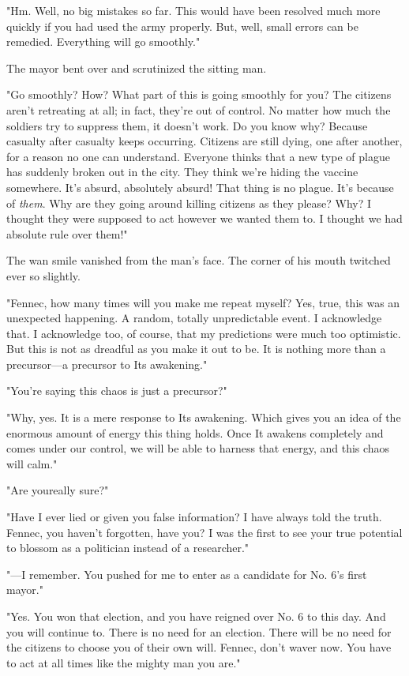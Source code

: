 "Hm. Well, no big mistakes so far. This would have been resolved much
more quickly if you had used the army properly. But, well, small errors
can be remedied. Everything will go smoothly."

The mayor bent over and scrutinized the sitting man.

"Go smoothly? How? What part of this is going smoothly for you? The
citizens aren't retreating at all; in fact, they're out of control. No
matter how much the soldiers try to suppress them, it doesn't work. Do
you know why? Because casualty after casualty keeps occurring. Citizens
are still dying, one after another, for a reason no one can understand.
Everyone thinks that a new type of plague has suddenly broken out in the
city. They think we're hiding the vaccine somewhere. It's absurd,
absolutely absurd! That thing is no plague. It's because of \emph{them}. Why
are they going around killing citizens as they please? Why? I thought
they were supposed to act however we wanted them to. I thought we had
absolute rule over them!"

The wan smile vanished from the man's face. The corner of his mouth
twitched ever so slightly.

"Fennec, how many times will you make me repeat myself? Yes, true, this
was an unexpected happening. A random, totally unpredictable event. I
acknowledge that. I acknowledge too, of course, that my predictions were
much too optimistic. But this is not as dreadful as you make it out to
be. It is nothing more than a precursor---a precursor to Its awakening."

"You're saying this chaos is just a precursor?"

"Why, yes. It is a mere response to Its awakening. Which gives you an
idea of the enormous amount of energy this thing holds. Once It awakens
completely and comes under our control, we will be able to harness that
energy, and this chaos will calm."

"Are you\el really sure?"

"Have I ever lied or given you false information? I have always told the
truth. Fennec, you haven't forgotten, have you? I was the first to see
your true potential to blossom as a politician instead of a researcher."

"---I remember. You pushed for me to enter as a candidate for No. 6's
first mayor."

"Yes. You won that election, and you have reigned over No. 6 to this
day. And you will continue to. There is no need for an election. There
will be no need for the citizens to choose you of their own will.
Fennec, don't waver now. You have to act at all times like the mighty
man you are."

